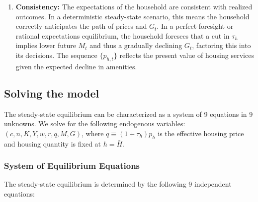 \begin{enumerate}
\begin{itemize}
        \item \textbf{Capital market:} The firm’s capital input equals the household’s capital stock: $K_t$ (used in production) = $K_t$ (owned by household). The rental rate $r_t$ adjusts to clear this market.

        \item \textbf{Housing market:} $h_t = \bar{H}$. The total housing demanded by the household equals the fixed housing stock. The house price $p_{h,t}$ adjusts each period to clear the housing market.
    \end{itemize}

    \item \textbf{Consistency:} The expectations of the household are consistent with realized outcomes. In a deterministic steady-state scenario, this means the household correctly anticipates the path of prices and $G_t$. In a perfect-foresight or rational expectations equilibrium, the household foresees that a cut in $\tau_h$ implies lower future $M_t$ and thus a gradually declining $G_t$, factoring this into its decisions. The sequence $\{p_{h,t}\}$ reflects the present value of housing services given the expected decline in amenities.
\end{enumerate}

\subsection{Solving the model}

The steady-state equilibrium can be characterized as a system of 9 equations in 9 unknowns. We solve for the following endogenous variables: $(c, n, K, Y, w, r, q, M, G)$, where $q \equiv (1+\tau_h)p_h$ is the effective housing price and housing quantity is fixed at $h = \bar{H}$.

\subsubsection{System of Equilibrium Equations}

The steady-state equilibrium is determined by the following 9 independent equations:

